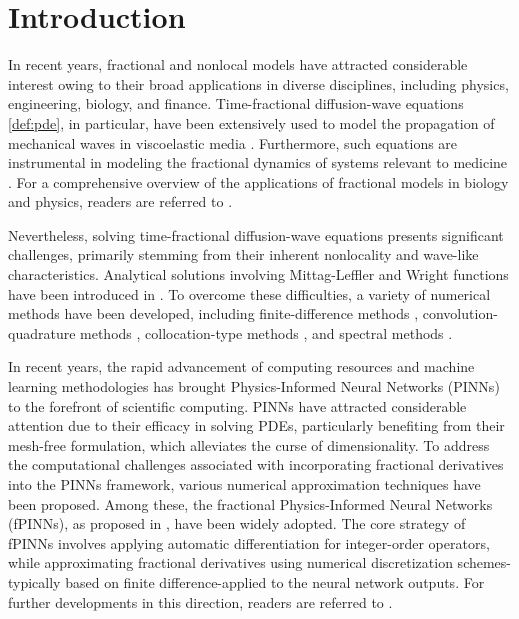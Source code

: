\documentclass[preprint,3p,times]{elsarticle}
\begin{document}
\section{Introduction}
\label{sec:intro}

In recent years, fractional and nonlocal models have attracted considerable interest owing to their broad applications in diverse disciplines, including physics, engineering, biology, and finance. Time-fractional diffusion-wave equations \eqref{def:pde}, in particular, have been extensively used to model the propagation of mechanical waves in viscoelastic media \cite{Mainardi1996, Mainardi2022}. Furthermore, such equations are instrumental in modeling the fractional dynamics of systems relevant to medicine \cite{Swain2025, BenSalah2025}. For a comprehensive overview of the applications of fractional models in biology and physics, readers are referred to \cite{Metzler2000, Metzler2014}.

Nevertheless, solving time-fractional diffusion-wave equations presents significant challenges, primarily stemming from their inherent nonlocality and wave-like characteristics. Analytical solutions involving Mittag-Leffler and Wright functions have been introduced in \cite{Sakamoto2011, Jiang2012, Agrawal2002}. To overcome these difficulties, a variety of numerical methods have been developed, including finite-difference methods \cite{Du2010, Sun2020}, convolution-quadrature methods \cite{Cuesta2006, Jin2017Correction}, collocation-type methods \cite{Zhu2019, Stynes2017}, and spectral methods \cite{Chen2020, Zayernouri2013}.

In recent years, the rapid advancement of computing resources and machine learning methodologies has brought Physics-Informed Neural Networks (PINNs) \cite{RaissiParisGE:2019:JCP, CaiMaoWangYinGE:2021:fluid, Cuomo2022:PINN:review} to the forefront of scientific computing. PINNs have attracted considerable attention due to their efficacy in solving PDEs, particularly benefiting from their mesh-free formulation, which alleviates the curse of dimensionality. To address the computational challenges associated with incorporating fractional derivatives into the PINNs framework, various numerical approximation techniques have been proposed. Among these, the fractional Physics-Informed Neural Networks (fPINNs), as proposed in \cite{Pang2019:fPINN}, have been widely adopted. The core strategy of fPINNs involves applying automatic differentiation for integer-order operators, while approximating fractional derivatives using numerical discretization schemes-typically based on finite difference-applied to the neural network outputs. For further developments in this direction, readers are referred to \cite{Lu2025, Vats2024}.
\end{document}
